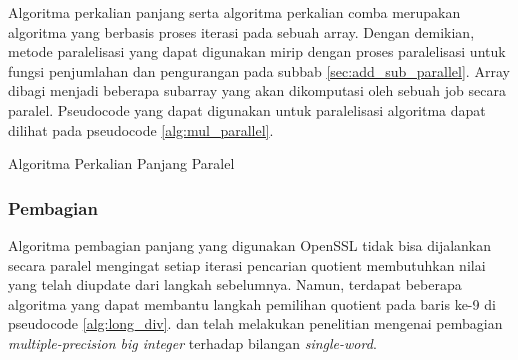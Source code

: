       Algoritma perkalian panjang serta algoritma perkalian comba merupakan algoritma yang berbasis proses iterasi pada sebuah array. Dengan demikian, metode paralelisasi yang dapat digunakan mirip dengan proses paralelisasi untuk fungsi penjumlahan dan pengurangan pada subbab \ref{sec:add_sub_parallel}. Array dibagi menjadi beberapa subarray yang akan dikomputasi oleh sebuah job secara paralel. Pseudocode yang dapat digunakan untuk paralelisasi algoritma dapat dilihat pada pseudocode \ref{alg:mul_parallel}.

      \begin{algorithm}
        \caption{Algoritma Perkalian Panjang Paralel}
        \label{alg:mul_parallel}
        \begin{algorithmic}[1]
          \Statex
          \State {}
          \EndFor
          \EndFor
          \State {}
          \EndFunction
        \end{algorithmic}
      \end{algorithm}

    \subsubsection{Pembagian}\label{sec:div_parallel}
      Algoritma pembagian panjang yang digunakan OpenSSL tidak bisa dijalankan secara paralel mengingat setiap iterasi pencarian quotient membutuhkan nilai yang telah diupdate dari langkah sebelumnya. Namun, terdapat beberapa algoritma yang dapat membantu langkah pemilihan quotient pada baris ke-9 di pseudocode \ref{alg:long_div}. \citet{parallel_short_div_emmart} dan \citet{parallel_short_div_takahashi} telah melakukan penelitian mengenai pembagian \textit{multiple-precision big integer} terhadap bilangan \textit{single-word}.

